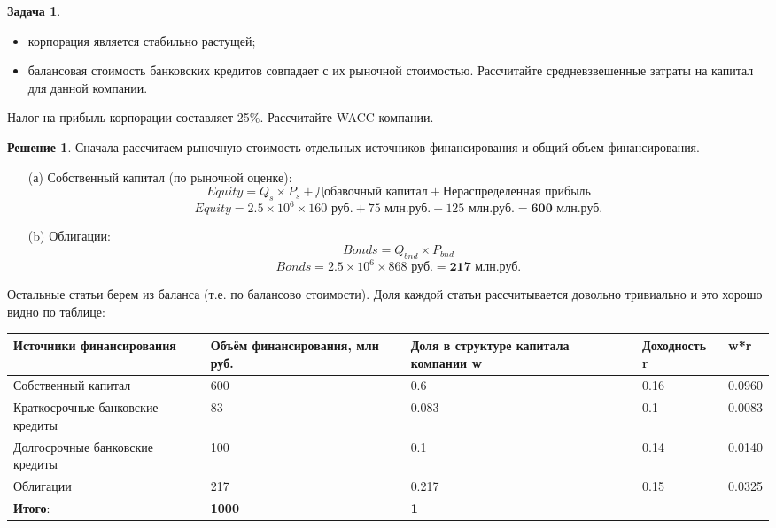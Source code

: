 \documentclass[a4paper, 14pt]{article}
\theoremstyle{plain} %
\theoremstyle{definition} %
\newtheorem*{solution}{Решение}
\newtheorem{problem}{Задача}[subsection]
\theoremstyle{remark} %
\begin{document}
\begin{problem}
\begin{itemize}
	\item корпорация является стабильно растущей;
	\item балансовая стоимость банковских кредитов совпадает с их рыночной стоимостью. Рассчитайте средневзвешенные затраты на капитал для данной компании.
\end{itemize}
Налог на прибыль корпорации составляет 25\%. Рассчитайте WACC компании.
\begin{solution}
	Сначала рассчитаем рыночную стоимость отдельных источников финансирования и общий объем финансирования.
\begin{itemize}
	\item[(а)] Собственный капитал (по рыночной оценке):
	\[Equity = Q_{s} \times P_{s} + \textit{Добавочный капитал} + \textit{Нераспределенная прибыль}\]
	\[Equity = 2.5 \times 10^{6} \times \text{160 руб.} +  \text{75 млн.руб.} +  \text{125 млн.руб.} = \textbf{600 млн.руб.}\]
	\item[(b)] Облигации:
	\[Bonds = Q_{bnd} \times P_{bnd}\]
	\[Bonds = 2.5 \times 10^{6} \times \text{868 руб.} = \textbf{217 млн.руб.}\]
\end{itemize}
	Остальные статьи берем из баланса (т.е. по балансово	 стоимости).
	Доля каждой статьи рассчитывается довольно тривиально и это хорошо видно по таблице:
\begin{center}
\begin{tabular}[0.88\textwidth]{|p{3.2cm}|p{3.2cm}|p{3.2cm}|l|l|}
\hline
Источники финансирования         & Объём финансирования, млн руб. & Доля в структуре капитала компании w & Доходность r & w*r     \\
\hline
Собственный капитал              & 600                            & 0.6                                  & 0.16         & 0.0960  \\
\hline
Краткосрочные банковские кредиты & 83                             & 0.083                                & 0.1          & 0.0083  \\
\hline
Долгосрочные банковские кредиты  & 100                            & 0.1                                  & 0.14         & 0.0140  \\
\hline
Облигации                        & 217                            & 0.217                                & 0.15         & 0.0325  \\
\hline
\textbf{Итого}:                           & \textbf{1000}                           & \textbf{1}                                    &              &         \\
\hline
\end{tabular}
\end{center}


\end{solution}
\end{problem}
\end{document}
